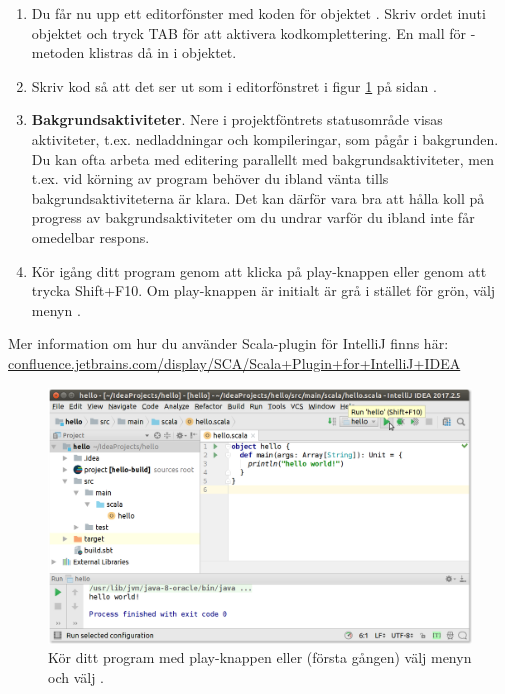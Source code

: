 \begin{enumerate}
\item Du får nu upp ett editorfönster med koden för objektet . Skriv ordet  inuti objektet och tryck TAB för att aktivera kodkomplettering. En mall för -metoden klistras då in i objektet.

\item Skriv kod så att det ser ut som i editorfönstret i figur \ref{fig:idea:hello-world} på sidan \pageref{fig:idea:hello-world}.

\item \textbf{Bakgrundsaktiviteter}. Nere i projektföntrets statusområde visas aktiviteter, t.ex. nedladdningar och kompileringar, som pågår i bakgrunden. Du kan ofta arbeta med editering parallellt med bakgrundsaktiviteter, men t.ex. vid körning av program behöver du ibland vänta tills bakgrundsaktiviteterna är klara. Det kan därför vara bra att hålla koll på progress av bakgrundsaktiviteter om du undrar varför du ibland inte får omedelbar respons.


\item Kör igång ditt program genom att klicka på play-knappen eller genom att trycka Shift+F10. Om play-knappen är initialt är grå i stället för grön, välj menyn .

\end{enumerate}


\noindent Mer information om hur du använder Scala-plugin för IntelliJ finns här:\\
\href{https://confluence.jetbrains.com/display/SCA/Scala+Plugin+for+IntelliJ+IDEA}{confluence.jetbrains.com/display/SCA/Scala+Plugin+for+IntelliJ+IDEA}

\begin{figure}
\centering
\includegraphics[width=1.0\textwidth]{../img/intellij/idea-hello.png}
\caption{Kör ditt program med play-knappen eller (första gången) välj menyn  och välj .}
\label{fig:idea:hello-world}
\end{figure}

